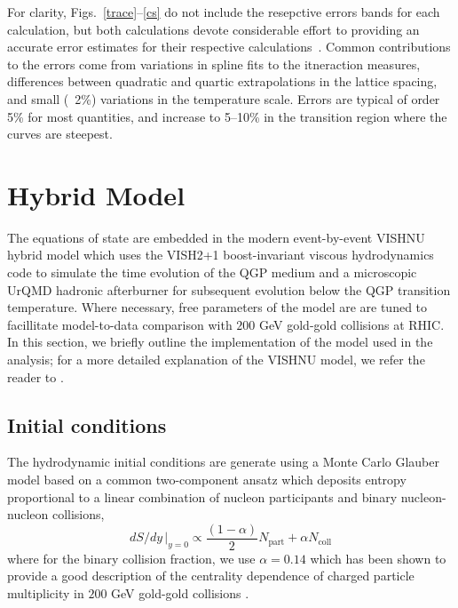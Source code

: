 \documentclass[aps,prc,reprint,amsmath,nofootinbib,superscriptaddress]{revtex4-1}
\begin{document}
For clarity, Figs.~\ref{trace}--\ref{cs} do not include the resepctive errors bands for each calculation, but both calculations devote considerable effort
to providing an accurate error estimates for their respective calculations~\cite{Borsanyi:2013bia,Bazavov:2014pvz}.  Common contributions to the errors
come from variations in spline fits to the itneraction measures, differences between quadratic and quartic extrapolations in the lattice spacing, and
small (~2\%) variations in the temperature scale.  Errors are typical of order 5\% for most quantities, and increase to 5--10\% in the transition region
where the curves are steepest.


\section{Hybrid Model}

The equations of state are embedded in the modern event-by-event VISHNU hybrid model which uses the VISH2+1 boost-invariant viscous hydrodynamics code to simulate the 
time evolution of the QGP medium and a microscopic UrQMD hadronic afterburner for subsequent evolution below the QGP transition temperature. Where necessary, free
parameters of the model are are tuned to facillitate model-to-data comparison with $200$ GeV gold-gold collisions at RHIC. In this section, we briefly outline
the implementation of the model used in the analysis; for a more detailed explanation of the VISHNU model, we refer the reader to \cite{}. 

\subsection{Initial conditions}
\label{initial_condition}

The hydrodynamic initial conditions are generate using a Monte Carlo Glauber model based on a common two-component ansatz which deposits entropy proportional to a linear combination 
of nucleon participants and binary nucleon-nucleon collisions,
\begin{equation}
 dS/dy \,\vert_{y=0} \propto \frac{(1-\alpha)}{2}N_\text{part} + \alpha N_\text{coll}
 \label{twocomponent}
\end{equation}
where for the binary collision fraction, we use $\alpha=0.14$ which has been shown to provide a good description of the centrality dependence of charged particle 
multiplicity in $200$ GeV gold-gold collisions \cite{?}.
\end{document}
